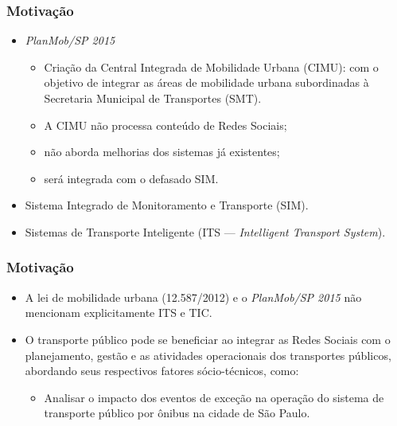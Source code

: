 \documentclass{beamer}
\begin{document}
\begin{frame}
\frametitle{Motivação}
\begin{itemize}
\item \textit{PlanMob/SP 2015}
\begin{itemize}
\item Criação da Central Integrada de Mobilidade Urbana (CIMU): com o objetivo de \alert{integrar as áreas de mobilidade urbana subordinadas à Secretaria Municipal de Transportes (SMT)}.
\item \alert{A CIMU não processa conteúdo de Redes Sociais};
\item \alert{não aborda melhorias dos sistemas já existentes};
\item \alert{será integrada com o defasado SIM}.
\end{itemize}
\end{itemize}

\begin{itemize}
\item Sistema Integrado de Monitoramento e Transporte (SIM).
\item Sistemas de Transporte Inteligente (ITS --- \textit{Intelligent Transport System}).
\end{itemize}
\end{frame}
\begin{frame}
\frametitle{Motivação}
\begin{itemize}
\item A lei de mobilidade urbana (12.587/2012) e o \textit{PlanMob/SP 2015} \alert{não mencionam explicitamente ITS e TIC}.
\end{itemize}
\begin{itemize}
\item O transporte público \alert{pode se beneficiar ao integrar as Redes Sociais com o planejamento, gestão e as atividades operacionais dos transportes públicos}, abordando seus respectivos fatores sócio-técnicos, como:
\begin{itemize}
\item \alert{Analisar o impacto dos eventos de exceção na operação do sistema de transporte público por ônibus na cidade de São Paulo}.
\end{itemize}
\end{itemize}
\end{frame}
\end{document}
